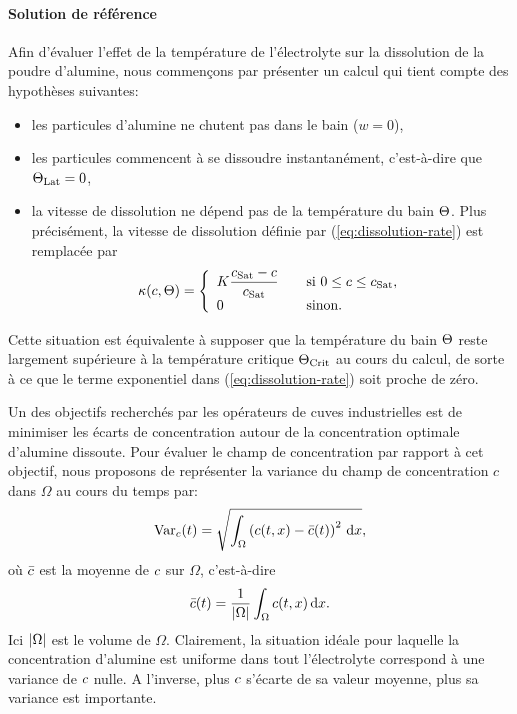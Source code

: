 \paragraph{Solution de référence} Afin d'évaluer l'effet de la
température de l'électrolyte sur la dissolution de la poudre
d'alumine, nous commençons par présenter un calcul qui tient compte
des hypothèses suivantes:
\begin{itemize}
\item les particules d'alumine ne chutent pas dans le bain ($w = 0$),
\item les particules commencent à se dissoudre instantanément, c'est-à-dire que $\Theta_\text{Lat} = 0$,
\item la vitesse de dissolution ne dépend pas de la température du
  bain $\Theta$. Plus précisément, la vitesse de dissolution
  définie par (\ref{eq:dissolution-rate}) est remplacée par
\begin{equation}
  \kappa(c, \Theta)= \left\{
  \begin{array}{ll}
    K\displaystyle\frac{c_\text{Sat} - c}{c_\text{Sat}} &\quad \text{si } 0\leq
    c \leq c_\text{Sat},\\
    0& \quad \text{sinon}.
  \end{array}
  \right.
\end{equation}
\end{itemize}
Cette situation est équivalente à supposer que la température du
bain $\Theta$ reste largement supérieure à la température
critique $\Theta_\text{Crit}$ au cours du calcul, de sorte à ce que le terme
exponentiel dans (\ref{eq:dissolution-rate}) soit proche de zéro.

Un des objectifs recherchés par les opérateurs de cuves
industrielles est de minimiser les écarts de concentration autour de
la concentration optimale d'alumine dissoute. Pour évaluer le champ
de concentration par rapport à cet objectif, nous proposons de
représenter la variance  du champ de concentration
$c$ dans $\Omega$ au cours du temps par:
\begin{equation}
  \operatorname{Var}_c(t) = \sqrt{\int_\Omega\left( c(t, x) - \bar {c}(t) \right)^2\,\mathrm dx},
\end{equation}
où $\bar {c}$ est la moyenne de $c$ sur
$\Omega$, c'est-à-dire
\begin{equation}
  \bar {c}(t) = \frac{1}{\left\lvert \Omega \right\rvert}\int_\Omega c(t, x)\,\mathrm dx.
\end{equation}
Ici $\left\lvert \Omega \right\rvert$ est le volume de $\Omega$. Clairement, la situation
idéale pour laquelle la concentration d'alumine est uniforme dans tout
l'électrolyte correspond à une variance de $c$ nulle. A
l'inverse, plus $c$ s'écarte de sa valeur moyenne, plus
sa variance est importante.

